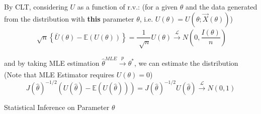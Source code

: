     By CLT, considering $ U $ as a function of r.v.: (for a given $ \theta  $ and the data generated from the distribution with \textbf{this} parameter $ \theta  $, i.e. $ U(\theta )=U\left(\theta ;\vec{X}(\theta )\right) $)
    \begin{align}
        \sqrt[]{n}\left\{ \bar{U}(\theta )-\mathbb{E}(U(\theta )) \right\} = \dfrac{1}{\sqrt[]{n}} U(\theta ) \xrightarrow[]{\mathscr{L}} N(0,\dfrac{I(\theta )}{n})
    \end{align}

    and by taking MLE estimation $ \hat{\theta }^{MLE}\xrightarrow[]{p} \theta ^* $, we can estimate the distribution (Note that MLE Estimator requires $ U(\theta )=0 $)
    \begin{equation}
        J(\hat{\theta })^{-1/2}\left(U(\hat{\theta })-\mathbb{E}(U(\hat{\theta } ))\right)=J(\hat{\theta })^{-1/2}U(\hat{\theta }) \xrightarrow[]{\mathscr{L}} N(0,1)
    \end{equation}
    

\begin{point}
    Statistical Inference on Parameter $ \theta  $
\end{point}

